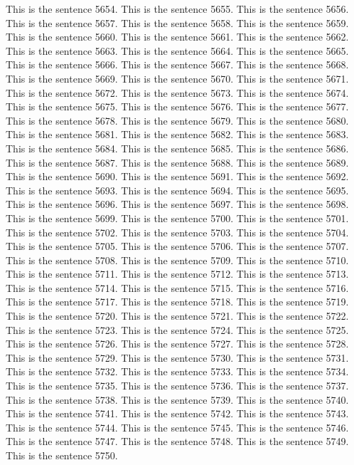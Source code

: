 \documentclass{article}
\begin{document}
This is the sentence 5654.
This is the sentence 5655.
This is the sentence 5656.
This is the sentence 5657.
This is the sentence 5658.
This is the sentence 5659.
This is the sentence 5660.
This is the sentence 5661.
This is the sentence 5662.
This is the sentence 5663.
This is the sentence 5664.
This is the sentence 5665.
This is the sentence 5666.
This is the sentence 5667.
This is the sentence 5668.
This is the sentence 5669.
This is the sentence 5670.
This is the sentence 5671.
This is the sentence 5672.
This is the sentence 5673.
This is the sentence 5674.
This is the sentence 5675.
This is the sentence 5676.
This is the sentence 5677.
This is the sentence 5678.
This is the sentence 5679.
This is the sentence 5680.
This is the sentence 5681.
This is the sentence 5682.
This is the sentence 5683.
This is the sentence 5684.
This is the sentence 5685.
This is the sentence 5686.
This is the sentence 5687.
This is the sentence 5688.
This is the sentence 5689.
This is the sentence 5690.
This is the sentence 5691.
This is the sentence 5692.
This is the sentence 5693.
This is the sentence 5694.
This is the sentence 5695.
This is the sentence 5696.
This is the sentence 5697.
This is the sentence 5698.
This is the sentence 5699.
This is the sentence 5700.
This is the sentence 5701.
This is the sentence 5702.
This is the sentence 5703.
This is the sentence 5704.
This is the sentence 5705.
This is the sentence 5706.
This is the sentence 5707.
This is the sentence 5708.
This is the sentence 5709.
This is the sentence 5710.
This is the sentence 5711.
This is the sentence 5712.
This is the sentence 5713.
This is the sentence 5714.
This is the sentence 5715.
This is the sentence 5716.
This is the sentence 5717.
This is the sentence 5718.
This is the sentence 5719.
This is the sentence 5720.
This is the sentence 5721.
This is the sentence 5722.
This is the sentence 5723.
This is the sentence 5724.
This is the sentence 5725.
This is the sentence 5726.
This is the sentence 5727.
This is the sentence 5728.
This is the sentence 5729.
This is the sentence 5730.
This is the sentence 5731.
This is the sentence 5732.
This is the sentence 5733.
This is the sentence 5734.
This is the sentence 5735.
This is the sentence 5736.
This is the sentence 5737.
This is the sentence 5738.
This is the sentence 5739.
This is the sentence 5740.
This is the sentence 5741.
This is the sentence 5742.
This is the sentence 5743.
This is the sentence 5744.
This is the sentence 5745.
This is the sentence 5746.
This is the sentence 5747.
This is the sentence 5748.
This is the sentence 5749.
This is the sentence 5750.
\end{document}
